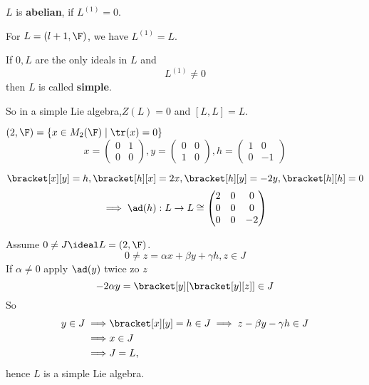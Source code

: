 \begin{definition}
    $L$ is \textbf{abelian}, if $L^{(1)} = 0$.
\end{definition}

\begin{remark}
    For $L = \sl(l+1, \F)$, we have $L^{(1)} = L$.
\end{remark}

\begin{definition}
    If $0,L$ are the only ideals in $L$ and
    $$ L^{(1)} \ne 0$$
    then $L$ is called \textbf{simple}.
\end{definition}

\begin{remark}
    So in a simple Lie algebra,$ Z(L) = 0$ and $ [L,L] = L.$
\end{remark}

\begin{example}
    $\sl(2, \F) = \{x \in M_2(\F) \mid \tr(x) = 0\}$
    $$ x = \begin{pmatrix}
        0 & 1 \\
        0 & 0
    \end{pmatrix}, y = \begin{pmatrix}
        0 & 0 \\
        1 & 0
    \end{pmatrix}, h = \begin{pmatrix}
        1 & 0 \\
        0 & -1
    \end{pmatrix}$$

    $$ \bracket[x][y] = h, \bracket[h][x] = 2x, \bracket[h][y] = - 2y, \bracket[h][h] = 0 $$
    $$ \implies \ad (h) : L \to L \cong \begin{pmatrix}
        2 & 0 & 0 \\
        0 & 0 & 0 \\
        0 & 0 & -2
    \end{pmatrix}$$

    Assume $0 \neq J \ideal L = \sl(2 , \F)$.
    $$ 0 \neq z = \alpha x + \beta y + \gamma h, z\in J $$
    If $\alpha \neq 0$ apply $\ad(y)$ twice zo $z$
    $$ -2 \alpha y = \bracket[y][\bracket[y][z]] \in J $$
    So
    \begin{align*}
        y \in J \implies& \bracket[x][y]=h \in J \implies z - \beta y - \gamma h \in J\\
        \implies & x \in J\\
        \implies & J = L,
    \end{align*}
    hence $L$ is a simple Lie algebra.
\end{example}

